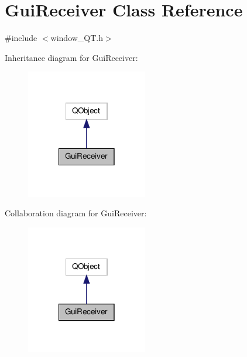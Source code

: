 \hypertarget{classGuiReceiver}{\section{Gui\-Receiver Class Reference}
\label{classGuiReceiver}
}


{\ttfamily \#include $<$window\-\_\-\-Q\-T.\-h$>$}



Inheritance diagram for Gui\-Receiver\-:\nopagebreak
\begin{figure}[H]
\begin{center}
\leavevmode
\includegraphics[width=150pt]{classGuiReceiver__inherit__graph}
\end{center}
\end{figure}


Collaboration diagram for Gui\-Receiver\-:\nopagebreak
\begin{figure}[H]
\begin{center}
\leavevmode
\includegraphics[width=150pt]{classGuiReceiver__coll__graph}
\end{center}
\end{figure}

